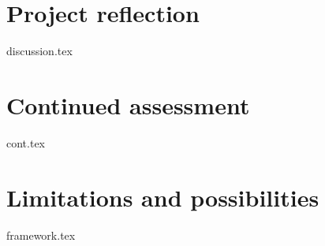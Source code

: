 











\section{Project reflection}\label{sec:whatif:discussion}
    {{discussion.tex}}


\section{Continued assessment}\label{sec:whatif:cont}
{{cont.tex}}


\section{Limitations and possibilities}\label{sec:whatif:framework}
    {{framework.tex}}





    
